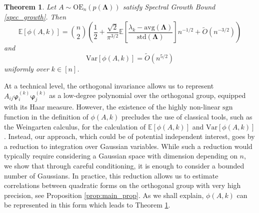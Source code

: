 \documentclass[reqno]{amsart}
\numberwithin{equation}{section}
\newcommand\E{\mathbb{E}}
\newtheorem{theorem}{Theorem}[section]
\begin{document}
\begin{theorem}\label{thm:main}
Let $A \sim \mathrm{OE}_n(p(\bm{\Lambda}))$ satisfy Spectral Growth Bound \ref{spec_growth}. Then
\begin{equation}\label{eqn:expectation}
    \E \left[\phi(A,k) \right] = {n \choose 2} \left( \frac{1}{2} + \frac{\sqrt{2}}{\pi^{3/2}} \E \left[ \frac{\lambda_k - \mathrm{avg}(\bm{\Lambda})}{\mathrm{std}(\bm{\Lambda})} \right]n^{-1/2}  + \tilde O\left(n^{-3/2}\right) \right)
\end{equation}
and 
\begin{equation}\label{eqn:variance}
    \mathrm{Var}\left[\phi(A,k) \right] = \tilde O(n^{5/2})
\end{equation} uniformly over $k \in [n]$.
\end{theorem}
At a technical level, the orthogonal invariance allows us to represent $A_{ij}\bm \varphi_i^{(k)}\bm \varphi_j^{(k)}$ as a low-degree polynomial over the orthogonal group, equipped with its Haar measure. However, the existence of the highly non-linear $\mathrm{sgn}$ function in the definition of $\phi(A,k)$ precludes the use of classical tools, such as the Weingarten calculus, for the calculation of $\E\left[\phi(A,k) \right]$ and $\mathrm{Var}\left[\phi(A,k) \right]$. Instead, our approach, which could be of potential independent interest, goes by a reduction to integration over Gaussian variables. While such a reduction would typically require considering a Gaussian space with dimension depending on $n$, we show that through careful conditioning, it is enough to consider a bounded number of Gaussians. In practice, this reduction allows us to estimate correlations between quadratic forms on the orthogonal group with very high precision, see Proposition \ref{prop:main_prop}. As we shall explain, $\phi(A,k)$ can be represented in this form which leads to Theorem \ref{thm:main}.
\end{document}
